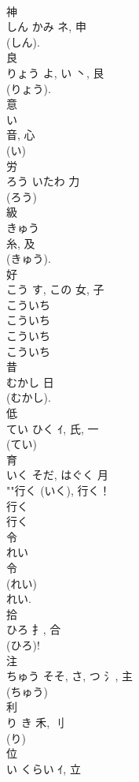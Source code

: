 \documentclass[8pt]{extreport}
\begin{document}
\begin{CJK}{UTF8}{min}
\\	神	
\\	しん	かみ	ネ, 申	
\\	(しん). 
\\	良	
\\	りょう	よ, い	丶, 艮	
\\	(りょう). 
\\	意	
\\	い	
\\	音, 心	
\\	(い) 
\\	労	
\\	ろう	いたわ	力		
\\	(ろう) 
\\	級	
\\	きゅう	
\\	糸, 及	
\\	(きゅう).	
\\	好	
\\	こう	す, この	女, 子	
\\	こういち
\\	こういち
\\	こういち 
\\	こういち 
\\	昔	
\\	むかし	日		
\\	(むかし). 
\\	低	
\\	てい	ひく	ｲ, 氏, 一	
\\	(てい) 
\\	育	
\\	いく	そだ, はぐく	月		
\\	""行く (いく), 行く！
\\	行く
\\	行く 
\\	令	
\\	れい	
\\	令	
\\	(れい) 
\\	れい. 
\\	拾	
\\	ひろ	扌, 合	
\\	(ひろ)! 
\\	注	
\\	ちゅう	そそ, さ, つ	氵, 主	
\\	(ちゅう) 
\\	利	
\\	り	き	禾, 刂	
\\	(り) 
\\	位	
\\	い	くらい	ｲ, 立	

\end{CJK}
\end{document}

